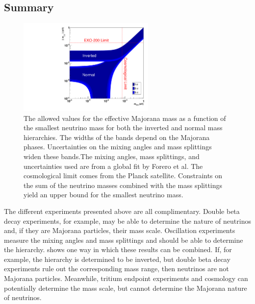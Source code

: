 \documentclass[herrin-thesis.tex]{subfiles}
\begin{document}
\subsection{Summary}

\begin{figure}[htb]
	\centering
	\includegraphics[width=0.6\textwidth]{./plots/nu_meff_v_mmin.pdf}
	\caption[Effective Majorana mass vs. smallest neutrino mass]{The allowed values for the effective Majorana mass as a function of the smallest neutrino mass for both the inverted and normal mass hierarchies. The widths of the bands depend on the Majorana phases. Uncertainties on the mixing angles and mass splittings widen these bands.The mixing angles, mass splittings, and uncertainties used are from a global fit by Forero et al.\cite{Forero:2012cr} The cosmological limit comes from the Planck satellite\cite{Ade:2013kl}. Constraints on the sum of the neutrino masses combined with the mass splittings yield an upper bound for the smallest neutrino mass.}
	\label{fig:nu_meff_v_mmin}
\end{figure}

The different experiments presented above are all complimentary. Double beta decay experiments, for example, may be able to determine the nature of neutrinos and, if they are Majorana particles, their mass scale. Oscillation experiments measure the mixing angles and mass splittings and should be able to determine the hierarchy.  shows one way in which these results can be combined. If, for example, the hierarchy is determined to be inverted, but double beta decay experiments rule out the corresponding mass range, then neutrinos are not Majorana particles. Meanwhile, tritium endpoint experiments and cosmology can potentially determine the mass scale, but cannot determine the Majorana nature of neutrinos.
\end{document}
